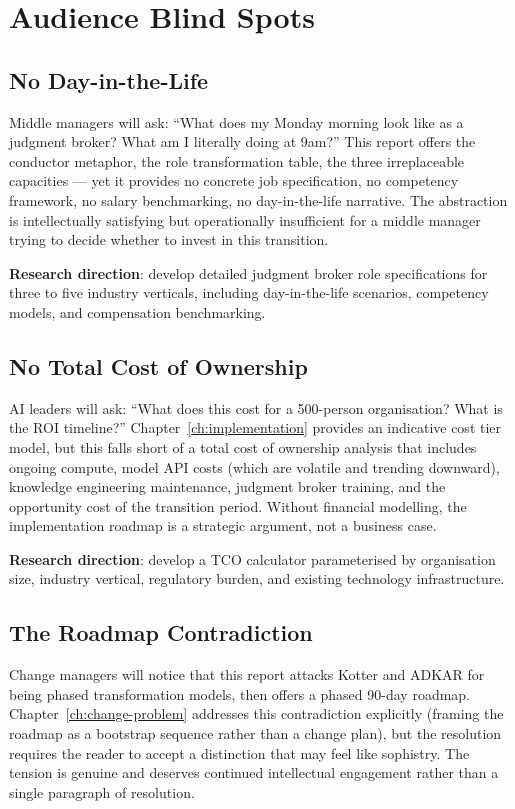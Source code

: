 \section{Audience Blind Spots}

\subsection{No Day-in-the-Life}

Middle managers will ask: ``What does my Monday morning look like as a judgment broker? What am I literally doing at 9am?'' This report offers the conductor metaphor, the role transformation table, the three irreplaceable capacities --- yet it provides no concrete job specification, no competency framework, no salary benchmarking, no day-in-the-life narrative. The abstraction is intellectually satisfying but operationally insufficient for a middle manager trying to decide whether to invest in this transition.

\textbf{Research direction}: develop detailed judgment broker role specifications for three to five industry verticals, including day-in-the-life scenarios, competency models, and compensation benchmarking.

\subsection{No Total Cost of Ownership}

AI leaders will ask: ``What does this cost for a 500-person organisation? What is the ROI timeline?'' Chapter~\ref{ch:implementation} provides an indicative cost tier model, but this falls short of a total cost of ownership analysis that includes ongoing compute, model API costs (which are volatile and trending downward), knowledge engineering maintenance, judgment broker training, and the opportunity cost of the transition period. Without financial modelling, the implementation roadmap is a strategic argument, not a business case.

\textbf{Research direction}: develop a TCO calculator parameterised by organisation size, industry vertical, regulatory burden, and existing technology infrastructure.

\subsection{The Roadmap Contradiction}

Change managers will notice that this report attacks Kotter and ADKAR for being phased transformation models, then offers a phased 90-day roadmap. Chapter~\ref{ch:change-problem} addresses this contradiction explicitly (framing the roadmap as a bootstrap sequence rather than a change plan), but the resolution requires the reader to accept a distinction that may feel like sophistry. The tension is genuine and deserves continued intellectual engagement rather than a single paragraph of resolution.

